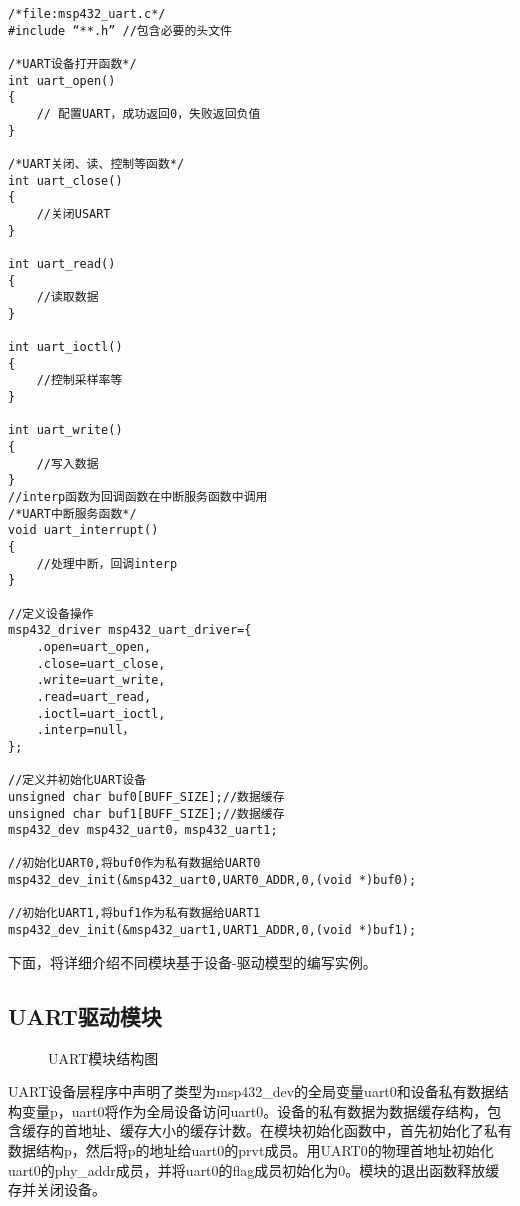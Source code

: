 \begin{lstlisting}
/*file:msp432_uart.c*/ 
#include “**.h” //包含必要的头文件

/*UART设备打开函数*/
int uart_open()
{
	// 配置UART，成功返回0，失败返回负值
}

/*UART关闭、读、控制等函数*/
int uart_close()
{
	//关闭USART
}

int uart_read()
{
	//读取数据
}

int uart_ioctl()
{
	//控制采样率等
}

int uart_write()
{
	//写入数据
}
//interp函数为回调函数在中断服务函数中调用
/*UART中断服务函数*/
void uart_interrupt()
{
	//处理中断，回调interp
}

//定义设备操作
msp432_driver msp432_uart_driver={
	.open=uart_open,
	.close=uart_close,
	.write=uart_write,
	.read=uart_read,
	.ioctl=uart_ioctl,
	.interp=null，
};

//定义并初始化UART设备
unsigned char buf0[BUFF_SIZE];//数据缓存
unsigned char buf1[BUFF_SIZE];//数据缓存
msp432_dev msp432_uart0，msp432_uart1;

//初始化UART0,将buf0作为私有数据给UART0
msp432_dev_init(&msp432_uart0,UART0_ADDR,0,(void *)buf0);

//初始化UART1,将buf1作为私有数据给UART1
msp432_dev_init(&msp432_uart1,UART1_ADDR,0,(void *)buf1);
\end{lstlisting}

%
%

下面，将详细介绍不同模块基于设备-驱动模型的编写实例。

\subsection{UART驱动模块}
\begin{figure}[!htbp]
	\centering
	
	\caption{UART模块结构图}
	\label{fig::software:uart}
\end{figure}
UART设备层程序中声明了类型为msp432\_dev的全局变量uart0和设备私有数据结构变量p，uart0将作为全局设备访问uart0。设备的私有数据为数据缓存结构，包含缓存的首地址、缓存大小的缓存计数。在模块初始化函数中，首先初始化了私有数据结构p，然后将p的地址给uart0的prvt成员。用UART0的物理首地址初始化uart0的phy\_addr成员，并将uart0的flag成员初始化为0。模块的退出函数释放缓存并关闭设备。

